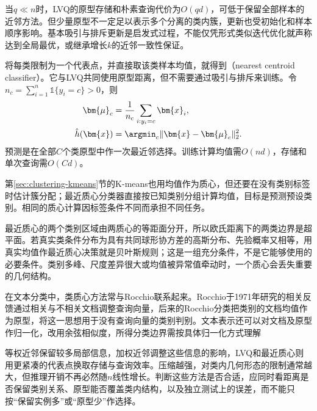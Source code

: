 当$q\ll n$时，LVQ的原型存储和朴素查询代价为$O(qd)$，可低于保留全部样本的近邻方法。但少量原型不一定足以表示多个分离的类内簇，更新也受初始化和样本顺序影响。基本吸引与排斥更新是启发式过程，不能仅凭形式类似迭代优化就声称达到全局最优，或继承增长$k$的近邻一致性保证。

将每类限制为一个代表点，并直接取该类样本均值，就得到（nearest centroid classifier）。它与LVQ共同使用原型距离，但不需要通过吸引与排斥来训练。令$n_c=\sum_{i=1}^n\mathbb{1}\{y_i=c\}>0$，则
\begin{align}
  \bm{\mu}_c&=\frac{1}{n_c}\sum_{i:y_i=c}\bm{x}_i,
  \label{eq:classification-centroid}\\
  \hat h(\bm{x})&=\argmin_c\|\bm{x}-\bm{\mu}_c\|_2^2.
  \label{eq:classification-nearest-centroid}
\end{align}
预测是在全部$C$个类原型中作一次最近邻选择。训练计算均值需$O(nd)$，存储和单次查询需$O(Cd)$。

第\ref{sec:clustering-kmeans}节的K-means也用均值作为质心，但还要在没有类别标签时估计簇分配；最近质心分类器直接按已知类别分组计算均值，目标是预测预设类别。相同的质心计算因标签条件不同而承担不同任务。

最近质心的两个类别区域由两质心的等距面分开，所以欧氏距离下的两类边界是超平面。若真实类条件分布为具有共同球形协方差的高斯分布、先验概率又相等，用真实均值作最近质心决策就是贝叶斯规则；这是一组充分条件，不是它能够使用的必要条件。类别多峰、尺度差异很大或均值被异常值牵动时，一个质心会丢失重要的几何结构。

在文本分类中，类质心方法常与Rocchio联系起来。Rocchio于1971年研究的相关反馈通过相关与不相关文档调整查询向量，后来的Rocchio分类把类别的文档均值作为原型，将这一思想用于没有查询向量的类别判别。文本表示还可以对文档及原型作归一化，改用余弦相似度，所得分类边界需按具体归一化方式理解

等权近邻保留较多局部信息，加权近邻调整这些信息的影响，LVQ和最近质心则用更紧凑的代表点换取存储与查询效率。压缩越强，对类内几何形态的限制通常越大，但推理开销不再必然随$n$线性增长。判断这些方法是否合适，应同时看距离是否保留类别关系、原型能否覆盖类内结构，以及独立测试上的误差，而不能只按“保留实例多”或“原型少”作选择。
